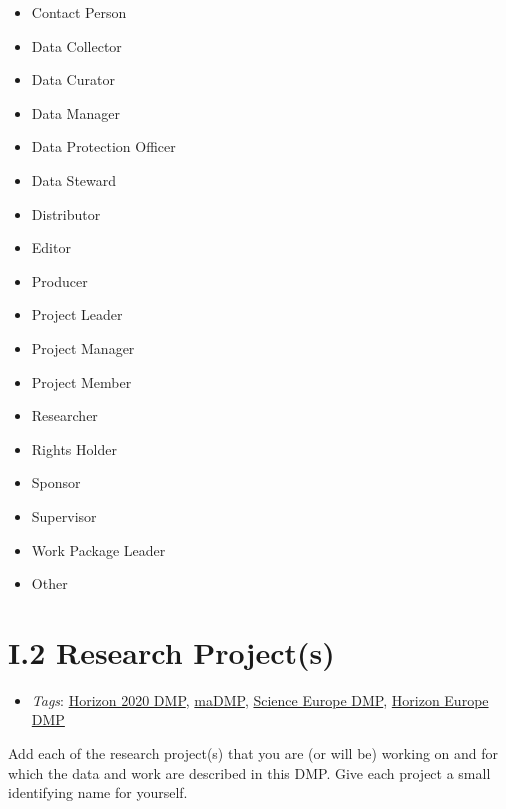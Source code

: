 \documentclass[a4paper,12pt]{report}
\begin{document}
\begin{itemize}
  \item[\CheckmarkBold] Contact Person
  \item[\CheckmarkBold] Data Collector
  \item[\XSolidBrush] Data Curator
  \item[\CheckmarkBold] Data Manager
  \item[\XSolidBrush] Data Protection Officer
  \item[\CheckmarkBold] Data Steward
  \item[\XSolidBrush] Distributor
  \item[\XSolidBrush] Editor
  \item[\XSolidBrush] Producer
  \item[\XSolidBrush] Project Leader
  \item[\CheckmarkBold] Project Manager
  \item[\XSolidBrush] Project Member
  \item[\XSolidBrush] Researcher
  \item[\CheckmarkBold] Rights Holder
  \item[\XSolidBrush] Sponsor
  \item[\XSolidBrush] Supervisor
  \item[\XSolidBrush] Work Package Leader
  \item[\XSolidBrush] Other
\end{itemize}




\section*{\protect\textcolor{colorSecId}{I.2} Research Project(s)}

\label{1e85da40-bbfc-4180-903e-6c569ed2da38.c3dabaaf-c946-4a0d-889c-ede966f97667}


\begin{itemize}
  \item \textit{Tags}: \ul{Horizon 2020 DMP}, \ul{maDMP}, \ul{Science Europe DMP}, \ul{Horizon Europe DMP}
  \end{itemize}


\noindent
\begin{markdown}
Add each of the research project(s) that you are (or will be) working on and for which the data and work are described in this DMP. Give each project a small identifying name for yourself.
\end{markdown}
\end{document}
